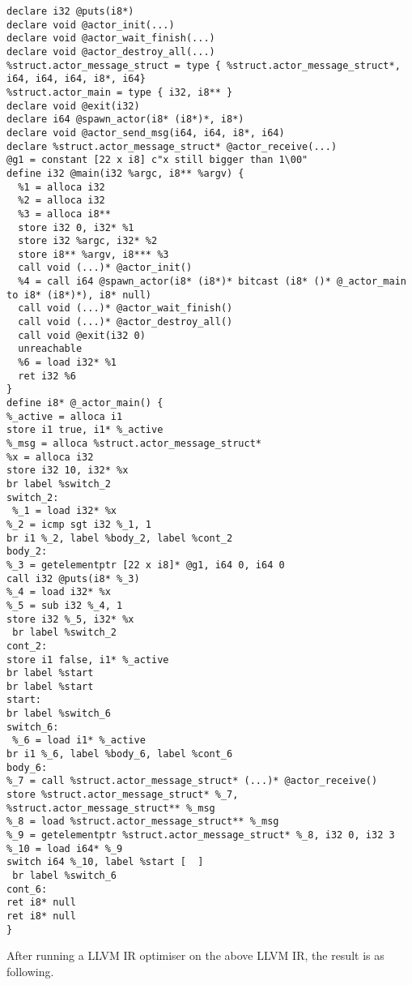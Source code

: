 \begin{verbatim}
declare i32 @puts(i8*)
declare void @actor_init(...)
declare void @actor_wait_finish(...)
declare void @actor_destroy_all(...)
%struct.actor_message_struct = type { %struct.actor_message_struct*, i64, i64, i64, i8*, i64}
%struct.actor_main = type { i32, i8** }
declare void @exit(i32)
declare i64 @spawn_actor(i8* (i8*)*, i8*)
declare void @actor_send_msg(i64, i64, i8*, i64)
declare %struct.actor_message_struct* @actor_receive(...)
@g1 = constant [22 x i8] c"x still bigger than 1\00"
define i32 @main(i32 %argc, i8** %argv) {
  %1 = alloca i32
  %2 = alloca i32
  %3 = alloca i8**
  store i32 0, i32* %1
  store i32 %argc, i32* %2
  store i8** %argv, i8*** %3
  call void (...)* @actor_init()
  %4 = call i64 @spawn_actor(i8* (i8*)* bitcast (i8* ()* @_actor_main to i8* (i8*)*), i8* null)
  call void (...)* @actor_wait_finish()
  call void (...)* @actor_destroy_all()
  call void @exit(i32 0)
  unreachable
  %6 = load i32* %1
  ret i32 %6
}
define i8* @_actor_main() {
%_active = alloca i1
store i1 true, i1* %_active
%_msg = alloca %struct.actor_message_struct*
%x = alloca i32
store i32 10, i32* %x
br label %switch_2
switch_2: 
 %_1 = load i32* %x
%_2 = icmp sgt i32 %_1, 1
br i1 %_2, label %body_2, label %cont_2
body_2: 
%_3 = getelementptr [22 x i8]* @g1, i64 0, i64 0
call i32 @puts(i8* %_3)
%_4 = load i32* %x
%_5 = sub i32 %_4, 1
store i32 %_5, i32* %x
 br label %switch_2
cont_2:
store i1 false, i1* %_active
br label %start
br label %start
start:
br label %switch_6
switch_6: 
 %_6 = load i1* %_active
br i1 %_6, label %body_6, label %cont_6
body_6: 
%_7 = call %struct.actor_message_struct* (...)* @actor_receive()
store %struct.actor_message_struct* %_7, %struct.actor_message_struct** %_msg
%_8 = load %struct.actor_message_struct** %_msg
%_9 = getelementptr %struct.actor_message_struct* %_8, i32 0, i32 3
%_10 = load i64* %_9
switch i64 %_10, label %start [  ]
 br label %switch_6
cont_6:
ret i8* null
ret i8* null
}
\end{verbatim}

After running a LLVM IR optimiser on the above LLVM IR, the result is as following.

